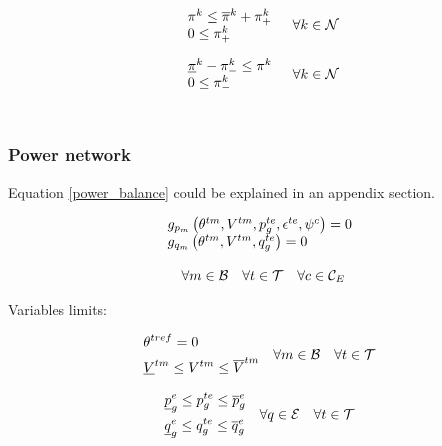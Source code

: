 \begin{equation}
\begin{array}{l}
 \pi^{k} \le \overline{\pi}^{k} + \pi^{k}_{+}\\
 0 \le \pi^{k}_{+}\\
\end{array} 
\quad \forall k  \in {\cal{N}}\\ 
\label{overp}
\end{equation}

\begin{equation}
\begin{array}{l}
\underline{\pi}^{k} - \pi^{k}_{-} \le \pi^{k}\\
0 \le \pi^{k}_{-}\\
\end{array} 
\quad \forall k  \in {\cal{N}}\\ 
\label{underp}
\end{equation}
\\

\subsubsection{Power network}

Equation \ref{power_balance} could be explained in an appendix section.
 
\begin{equation}
\begin{array}{l}
g_{p_m}\left(\theta^{tm}, V^{tm}, p_{g}^{te}, \epsilon^{te}, \psi^{c}\right) = 0\\
g_{q_m}\left(\theta^{tm}, V^{tm}, q_{g}^{te}\right) = 0\\
\\
\quad \forall m \in {\cal{B}} \quad \forall t  \in {\cal{T}} \quad \forall c  \in {\cal{C}}_{E}  
\end{array}
\label{power_balance}
\end{equation}

Variables limits:

\begin{equation}
\begin{aligned}
&\theta^{tref} = 0\\
&\underline{V}^{tm} \le V^{tm}  \le \overline{V}^{tm}\\
\end{aligned} 
\quad \forall m \in {\cal{B}} \quad \forall t  \in {\cal{T}}  
\label{ang_lims}
\end{equation}

\begin{equation}
\begin{aligned}
&\underline{p}_{g}^{e} \le p_{g}^{te}  \le \overline{p}_{g}^{e}\\
&\underline{q}_{g}^{e} \le q_{g}^{te}  \le \overline{q}_{g}^{e}\\
\end{aligned} 
\quad \forall q \in {\cal{E}} \quad \forall t  \in {\cal{T}}  
\label{power_lims}
\end{equation}

